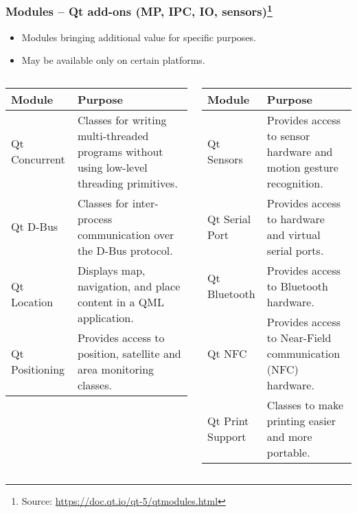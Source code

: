 \begin{frame}
  \frametitle{Modules -- Qt add-ons (MP, IPC, IO, sensors)\footnote
  {\tiny Source: \url{https://doc.qt.io/qt-5/qtmodules.html}}}

  \small
  \begin{itemize}
  \item Modules bringing additional value for specific purposes.
  \item May be available only on certain platforms.
  \end{itemize}

  \tiny
  \begin{columns}
    \begin{column}{0.48\textwidth}
      \begin{tabular}{|p{}|p{}|}
      \hline
      \textbf{Module} & \textbf{Purpose} \\
      \hline
      Qt Concurrent & Classes for writing multi-threaded programs without using low-level threading primitives. \\
      \hline
      Qt D-Bus & Classes for inter-process communication over the D-Bus protocol. \\
      \hline
      Qt Location & Displays map, navigation, and place content in a QML application. \\
      \hline
      Qt Positioning & Provides access to position, satellite and area monitoring classes.\\
      \hline
      \end{tabular}
    \end{column}
    \begin{column}{0.48\textwidth}
      \begin{tabular}{|p{}|p{}|}
      \hline
      \textbf{Module} & \textbf{Purpose} \\
      \hline
      Qt Sensors & Provides access to sensor hardware and motion gesture recognition. \\
      \hline
      Qt Serial Port & Provides access to hardware and virtual serial ports. \\
      \hline
      Qt Bluetooth & Provides access to Bluetooth hardware. \\
      \hline
      Qt NFC & Provides access to Near-Field communication (NFC) hardware. \\
      \hline
      Qt Print Support & Classes to make printing easier and more portable.\\
      \hline
      \end{tabular}
    \end{column}
  \end{columns}
\end{frame}

